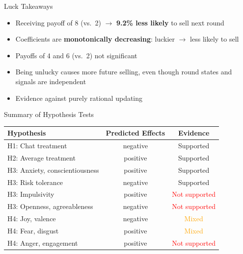 \documentclass{beamer}
\begin{document}
\begin{frame}{Luck Takeaways}
\begin{itemize}
    \item Receiving payoff of 8 (vs.\ 2) $\rightarrow$ \textbf{9.2\% less likely} to sell next round
    \item Coefficients are \textbf{monotonically decreasing}: luckier $\rightarrow$ less likely to sell
    \item Payoffs of 4 and 6 (vs.\ 2) not significant
    \item Being unlucky causes more future selling, even though round states and signals are independent
    \item Evidence against purely rational updating
\end{itemize}
\end{frame}



\begin{frame}{Summary of Hypothesis Tests}
\begin{center}
\begin{tabular}{lcc}
\toprule
\textbf{Hypothesis} & \textbf{Predicted Effects} & \textbf{Evidence} \\
\midrule
H1: Chat treatment & negative & \textcolor{green!50!black}{Supported} \\
H2: Average treatment & positive & \textcolor{green!50!black}{Supported} \\
H3: Anxiety, conscientiousness  & positive & \textcolor{green!50!black}{Supported} \\
H3: Risk tolerance & negative & \textcolor{green!50!black}{Supported} \\
H3: Impulsivity & positive & \textcolor{red}{Not supported}\\
H3: Openness, agreeableness & negative & \textcolor{red}{Not supported}\\
H4: Joy, valence & negative & \textcolor{orange}{Mixed} \\
H4: Fear, disgust  & positive & \textcolor{orange}{Mixed}\\
H4: Anger, engagement & positive & \textcolor{red}{Not supported}\\
\bottomrule
\end{tabular}
\end{center}
\end{frame}
\end{document}

